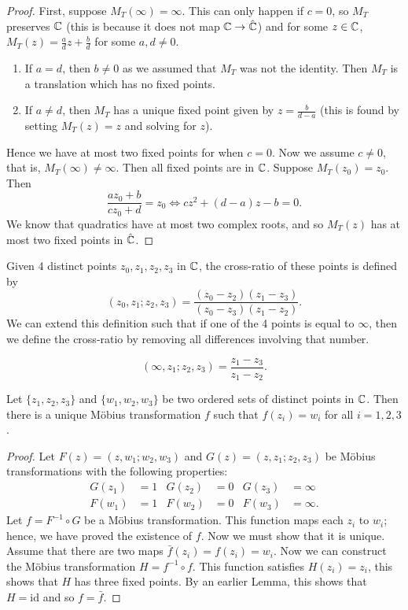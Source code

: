 \begin{proof}
    First, suppose $M_T(\infty) = \infty$. This can only happen if $c = 0$, so $M_T$ preserves $\mathbb{C}$ (this is because it does not map $\mathbb{C} \to \hat {\mathbb{C}}$) and for some $z \in \mathbb{C}$, $M_T(z) = \frac ad z + \frac bd$ for some $a, d \neq 0$. 
    \begin{enumerate}
        \item If $a = d$, then $b \neq 0$ as we assumed that $M_T$ was not the identity. Then $M_T$ is a translation which has no fixed points.

        \item If $a \neq d$, then $M_T$ has a unique fixed point given by $z = \frac{b}{d - a}$ (this is found by setting $M_T(z) = z$ and solving for $z$).
    \end{enumerate}
    Hence we have at most two fixed points for when $c = 0$. Now we assume $c \neq 0$, that is, $M_T(\infty) \neq \infty$. Then all fixed points are in $\mathbb{C}$. Suppose $M_T(z_0) = z_0$. Then 
    \[ \frac{az_0 + b}{cz_0 + d} = z_0 \iff cz^2 + (d - a)z - b = 0. \]
    We know that quadratics have at most two complex roots, and so $M_T(z)$ has at most two fixed points in $\hat {\mathbb{C}}$.
\end{proof}

\begin{definition}
    Given 4 distinct points $z_0, z_1, z_2, z_3$ in $\mathbb{C}$, the cross-ratio of these points is defined by
    \[ (z_0, z_1; z_2, z_3) = \frac{(z_0 - z_2)(z_1 - z_3)}{(z_0 - z_3)(z_1 - z_2)}.  \]
    We can extend this definition such that if one of the 4 points is equal to $\infty$, then we define the cross-ratio by removing all differences involving that number.
\end{definition}

\begin{example}
    \[ (\infty, z_1; z_2, z_3) = \frac{z_1 - z_3}{z_1 - z_2}. \]
\end{example}

\begin{theorem}
    Let $\{z_1, z_2, z_3\}$ and $\{w_1, w_2, w_3\}$ be two ordered sets of distinct points in $\mathbb{C}$. Then there is a unique M\"obius transformation $f$ such that $f(z_i) = w_i$ for all $i = 1, 2, 3$.
\end{theorem}

\begin{proof}
    Let $F(z) = (z, w_1; w_2, w_3)$ and $G(z) = (z, z_1; z_2, z_3)$ be M\"obius transformations with the following properties:
    \begin{align*}
        G(z_1) &= 1 & G(z_2) &= 0 & G(z_3) &= \infty \\
        F(w_1) &= 1 & F(w_2) &= 0 & F(w_3) &= \infty.
    \end{align*}
    Let $f = F^{-1} \circ G$ be a M\"obius transformation. This function maps each $z_i$ to $w_i$; hence, we have proved the existence of $f$. Now we must show that it is unique. Assume that there are two maps $\bar f(z_i) = f(z_i) = w_i$. Now we can construct the M\"obius transformation $H = f^{-1} \circ f$. This function satisfies $H(z_i) = z_i$, this shows that $H$ has three fixed points. By an earlier Lemma, this shows that $H = \text{id}$ and so $f = \bar f$.
\end{proof}
